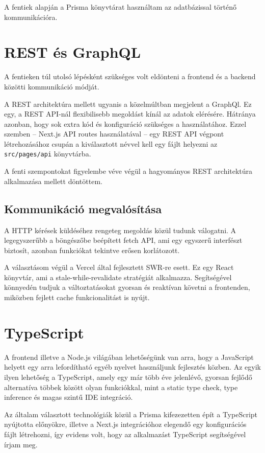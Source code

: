 A fentiek alapján a Prisma könyvtárat használtam az adatbázissal történő kommunikációra. \cite{Prisma}

\section{REST és GraphQL}

A fentieken túl utolsó lépésként szükséges volt eldönteni a frontend és a backend közötti kommunikáció módját.

A REST architektúra mellett ugyanis a közelmúltban megjelent a GraphQl. Ez egy, a REST API-nál flexibilisebb megoldást
kínál az adatok elérésére. Hátránya azonban, hogy sok extra kód és konfiguráció szükséges a használatához.
Ezzel szemben -- Next.js API routes használatával -- egy REST API végpont létrehozásához csupán a kiválasztott névvel kell egy fájlt
helyezni az \lstinline|src/pages/api| könyvtárba.

A fenti szempontokat figyelembe véve végül a hagyományos REST architektúra alkalmazása mellett döntöttem. \cite{REST}

\subsection{Kommunikáció megvalósítása}

A HTTP kérések küldéséhez rengeteg megoldás közül tudunk válogatni.
A legegyszerűbb a böngészőbe beépített fetch API\cite{fetchAPI}, ami egy egyszerű interfészt biztosít, azonban funkciókat tekintve erősen korlátozott.

A választásom végül a Vercel által fejlesztett SWR-re\cite{SWR} esett. Ez egy React könyvtár, ami a stale-while-revalidate
stratégiát alkalmazza. Segítségével könnyedén tudjuk a változtatásokat gyorsan és reaktívan követni a frontenden, miközben fejlett cache
funkcionalitást is nyújt.

\section{TypeScript}
A frontend illetve a Node.js világában lehetőségünk van arra, hogy a JavaScript helyett egy arra lefordítható
egyéb nyelvet használjunk fejlesztés közben. Az egyik ilyen lehetőség a TypeScript\cite{TypeScript}, amely egy már több éve jelenlévő,
gyorsan fejlődő alternatíva többek között olyan funkciókkal, mint a static type check, type inference és magas szintű IDE
integráció.

Az általam választott technológiák közül a Prisma kifezezetten épít a TypeScript nyújtotta előnyökre, illetve a Next.js
integrációhoz elegendő egy konfigurációs fájlt létrehozni, így evidens volt, hogy az alkalmazást TypeScript segítségével írjam meg.
